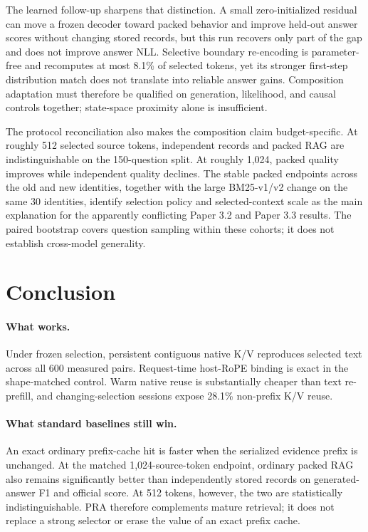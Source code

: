 \documentclass[11pt]{article}
\begin{document}
The learned follow-up sharpens that distinction. A small zero-initialized
residual can move a frozen decoder toward packed behavior and improve held-out
answer scores without changing stored records, but this run recovers only part
of the gap and does not improve answer NLL. Selective boundary re-encoding is
parameter-free and recomputes at most 8.1\% of selected tokens, yet its stronger
first-step distribution match does not translate into reliable answer gains.
Composition adaptation must therefore be qualified on generation, likelihood,
and causal controls together; state-space proximity alone is insufficient.

The protocol reconciliation also makes the composition claim budget-specific.
At roughly 512 selected source tokens, independent records and packed RAG are
indistinguishable on the 150-question split. At roughly 1,024, packed quality
improves while independent quality declines. The stable packed endpoints across
the old and new identities, together with the large BM25-v1/v2 change on the
same 30 identities, identify selection policy and selected-context scale as the
main explanation for the apparently conflicting Paper 3.2 and Paper 3.3
results. The paired bootstrap covers question sampling within these cohorts; it
does not establish cross-model generality.

\section{Conclusion}

\paragraph{What works.}
Under frozen selection, persistent contiguous native K/V reproduces selected
text across all 600 measured pairs. Request-time host-RoPE binding is exact in
the shape-matched control. Warm native reuse is substantially cheaper than text
re-prefill, and changing-selection sessions expose 28.1\% non-prefix K/V reuse.

\paragraph{What standard baselines still win.}
An exact ordinary prefix-cache hit is faster when the serialized evidence
prefix is unchanged. At the matched 1,024-source-token endpoint, ordinary
packed RAG also remains significantly better than independently stored records
on generated-answer F1 and official score. At 512 tokens, however, the two are
statistically indistinguishable. PRA therefore complements mature retrieval; it
does not replace a strong selector or erase the value of an exact prefix cache.
\end{document}
